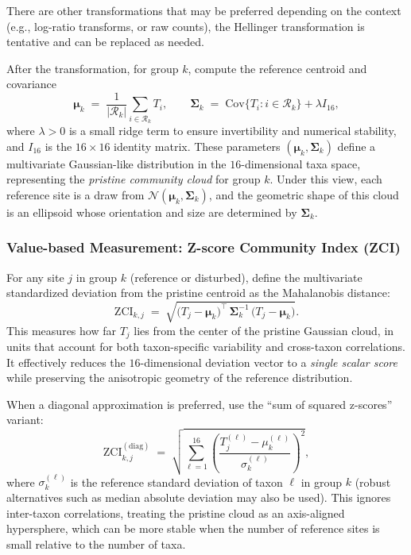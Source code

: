 There are other transformations that may be preferred depending on the context (e.g., log-ratio transforms, or raw counts),
the Hellinger transformation is tentative and can be replaced as needed.


After the transformation, for group $k$, compute the reference centroid and covariance
\[
\boldsymbol{\mu}_k \;=\; \frac{1}{|\mathcal{R}_k|}\sum_{i\in\mathcal{R}_k} T_{i}, 
\qquad
\boldsymbol{\Sigma}_k \;=\; \mathrm{Cov}\{T_{i}: i\in\mathcal{R}_k\} + \lambda I_{16},
\]
where $\lambda>0$ is a small ridge term to ensure invertibility and numerical stability, and 
$I_{16}$ is the $16\times 16$ identity matrix.
These parameters $(\boldsymbol{\mu}_k,\boldsymbol{\Sigma}_k)$ define a 
multivariate Gaussian-like distribution in the $16$-dimensional taxa space, representing the 
\emph{pristine community cloud} for group $k$.
Under this view, each reference site is a draw from 
$\mathcal{N}(\boldsymbol{\mu}_k, \boldsymbol{\Sigma}_k)$, 
and the geometric shape of this cloud is an ellipsoid whose orientation and size are determined by 
$\boldsymbol{\Sigma}_k$.

\subsubsection{Value-based Measurement: Z-score Community Index (ZCI)}
For any site $j$ in group $k$ (reference or disturbed), define the multivariate standardized 
deviation from the pristine centroid as the Mahalanobis distance:
\[
\mathrm{ZCI}_{k,j} \;=\; \sqrt{\big(T_{j}-\boldsymbol{\mu}_k\big)^{\top}\,\boldsymbol{\Sigma}_k^{-1}\,\big(T_{j}-\boldsymbol{\mu}_k\big)}.
\]
This measures how far $T_j$ lies from the center of the pristine Gaussian cloud, in units that 
account for both taxon-specific variability and cross-taxon correlations.
It effectively reduces the $16$-dimensional deviation vector to a \emph{single scalar score} 
while preserving the anisotropic geometry of the reference distribution.

When a diagonal approximation is preferred, use the ``sum of squared z-scores'' variant:
\[
\mathrm{ZCI}^{(\mathrm{diag})}_{k,j} \;=\; \sqrt{\sum_{\ell=1}^{16}\left(\frac{T^{(\ell)}_{j}-\mu^{(\ell)}_{k}}{\sigma^{(\ell)}_{k}}\right)^{2}},
\]
where $\sigma^{(\ell)}_{k}$ is the reference standard deviation of taxon $\ell$ in group $k$ 
(robust alternatives such as median absolute deviation may also be used).
This ignores inter-taxon correlations, treating the pristine cloud as an axis-aligned hypersphere, 
which can be more stable when the number of reference sites is small relative to the number of taxa.

